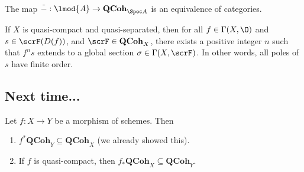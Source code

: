 \documentclass[12pt]{article}
\begin{document}
\begin{thm}
	The map $\tilde -:\lmod{A}\to \mathbf{QCoh}_{\Spec A}$ is an equivalence of categories.
\end{thm}
\begin{cor}
	If $X$ is quasi-compact and quasi-separated, then for all $f\in \Gamma(X,\O)$ and $s\in \scrF(D(f))$, and $\scrF\in \mathbf{QCoh}_X$,
	there exists a positive integer $n$ such that $f^ns$ extends to a global section $\sigma\in\Gamma(X,\scrF)$. In other words, 
	all poles of $s$ have finite order.
\end{cor}

\subsection{Next time...}
\begin{prop}
	Let $f:X\to Y$ be a morphism of schemes. Then 
	\begin{enumerate}
		\item $f^\ast\mathbf{QCoh}_Y\subseteq\mathbf{QCoh}_X$ (we already showed this).
		\item If $f$ is quasi-compact, then $f_\ast\mathbf{QCoh}_X\subseteq\mathbf{QCoh}_Y$.
	\end{enumerate}
\end{prop}
\end{document}
